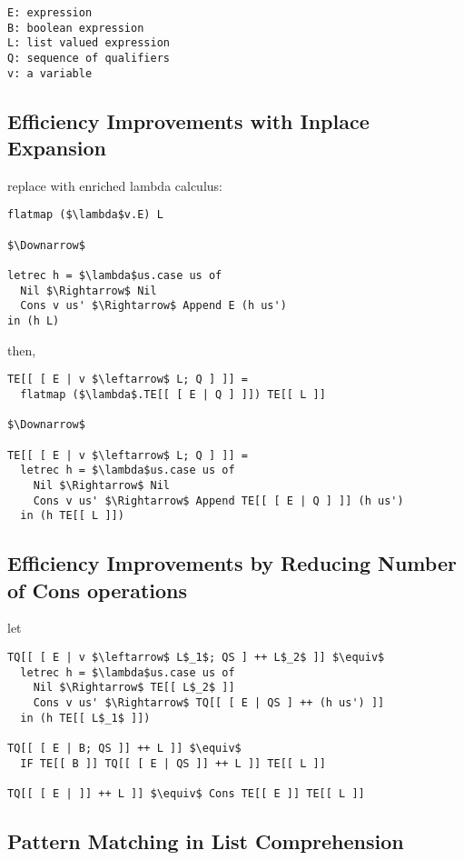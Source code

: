\documentclass[8pt]{extarticle}
\begin{document}
\begin{multicols*}{2}
\begin{lstlisting}
E: expression
B: boolean expression
L: list valued expression
Q: sequence of qualifiers
v: a variable
\end{lstlisting}

\subsection{Efficiency Improvements with Inplace Expansion}
replace with enriched lambda calculus:

\begin{lstlisting}
flatmap ($\lambda$v.E) L

$\Downarrow$
  
letrec h = $\lambda$us.case us of
  Nil $\Rightarrow$ Nil
  Cons v us' $\Rightarrow$ Append E (h us')
in (h L)
\end{lstlisting}

then,

\begin{lstlisting}
TE[[ [ E | v $\leftarrow$ L; Q ] ]] =
  flatmap ($\lambda$.TE[[ [ E | Q ] ]]) TE[[ L ]]

$\Downarrow$

TE[[ [ E | v $\leftarrow$ L; Q ] ]] =
  letrec h = $\lambda$us.case us of
    Nil $\Rightarrow$ Nil
    Cons v us' $\Rightarrow$ Append TE[[ [ E | Q ] ]] (h us')
  in (h TE[[ L ]])
\end{lstlisting}

\subsection{Efficiency Improvements by Reducing Number of Cons operations}

let

\begin{lstlisting}
TQ[[ [ E | v $\leftarrow$ L$_1$; QS ] ++ L$_2$ ]] $\equiv$
  letrec h = $\lambda$us.case us of
    Nil $\Rightarrow$ TE[[ L$_2$ ]]
    Cons v us' $\Rightarrow$ TQ[[ [ E | QS ] ++ (h us') ]]
  in (h TE[[ L$_1$ ]])

TQ[[ [ E | B; QS ]] ++ L ]] $\equiv$
  IF TE[[ B ]] TQ[[ [ E | QS ]] ++ L ]] TE[[ L ]]

TQ[[ [ E | ]] ++ L ]] $\equiv$ Cons TE[[ E ]] TE[[ L ]]
\end{lstlisting}

\vfill\null
\columnbreak

\subsection{Pattern Matching in List Comprehension}


\end{multicols*}
\end{document}
